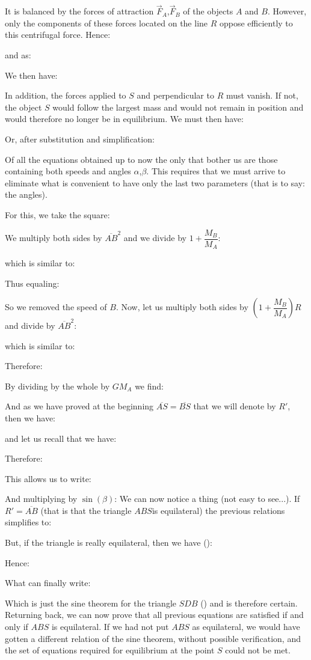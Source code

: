 	It is balanced by the forces of attraction $\vec{F}_A$,$\vec{F}_B$ of the objects $A$ and $B$. However, only the components of these forces located on the line $R$ oppose efficiently to this centrifugal force. Hence:
	
	
	and as:
	
	We then have:
	
	In addition, the forces applied to $S$ and perpendicular to $R$ must vanish. If not, the object $S$ would follow the largest mass and would not remain in position and would therefore no longer be in equilibrium. We must then have:
	
	Or, after substitution and simplification:
	
	Of all the equations obtained up to now the only that bother us are those containing both speeds and angles $\alpha$,$\beta$. This requires that we must arrive to eliminate what is convenient to have only the last two parameters (that is to say: the angles).

	For this, we take the square:
	
	We multiply both sides by $\overline{AB}^2$ and we divide by $1+\dfrac{M_B}{M_A}$:
	
	which is similar to:
	
	Thus equaling:
	
	So we removed the speed of $B$. Now, let us multiply both sides by $\left(1+\dfrac{M_B}{M_A}\right)R$ and divide by $\overline{AB}^2$:
	
	which is similar to:
	
	Therefore:
	
	By dividing by the whole by $GM_A$ we find:
	
	And as we have proved at the beginning $\overline{AS}=\overline{BS}$ that we will denote by $R'$, then we have:
	
	and let us recall that we have:
	
	Therefore:
	
	This allows us to write:
	
	And multiplying by $\sin(\beta)$:
	We can now notice a thing (not easy to see...). If $R'=\overline{AB}$ (that is that the triangle $ABS $is equilateral) the previous relations simplifies to:
	
	But, if the triangle is really equilateral, then we have ():
	
	Hence:
	
	What can finally write:
	
	Which is just the sine theorem for the triangle $SDB$ () and is therefore certain. Returning back, we can now prove that all previous equations are satisfied if and only if $ABS$ is equilateral. If we had not put $ABS$ as equilateral, we would have gotten a different relation of the sine theorem, without possible verification, and the set of equations required for equilibrium at the point $S$ could not be met.

